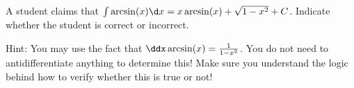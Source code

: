 \documentclass{ximera}
\author{Jim Talamo}
\begin{document}
\begin{exercise}
A student claims that $\int \arcsin(x) \d x = x \arcsin(x) + \sqrt{1-x^2}+C$.  Indicate whether the student is correct or incorrect. 

\begin{multipleChoice}  
\end{multipleChoice}

Hint: You may use the fact that $\ddx \arcsin(x) = \frac{1}{1-x^2}$.  You do not need to antidifferentiate anything to determine this!   Make sure you understand the logic behind how to verify whether this is true or not!
\end{exercise}
\end{document}
